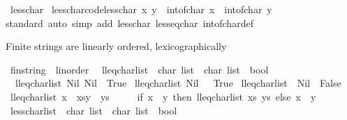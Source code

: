 \begin{isabellebody}
\isamarkupfalse%
\ less{\isacharunderscore}char\ \isanewline
less{\isacharunderscore}char{\isacharbrackleft}code{\isacharbrackright}{\isacharcolon}{\isachardoublequoteopen}less{\isacharunderscore}char\ x\ y\ {\isasymequiv}\ int{\isacharunderscore}of{\isacharunderscore}char\ x\ {\isacharless}\ int{\isacharunderscore}of{\isacharunderscore}char\ y{\isachardoublequoteclose}\isanewline
{}\isamarkupfalse%
\isanewline
%
\isadelimproof
\ \ %
\endisadelimproof
%
\isatagproof
{}\isamarkupfalse%
{\isacharparenleft}standard{\isacharcomma}\ auto\ simp\ add{\isacharcolon}\ less{\isacharunderscore}char\ less{\isacharunderscore}eq{\isacharunderscore}char\ int{\isacharunderscore}of{\isacharunderscore}char{\isacharunderscore}def{\isacharparenright}{\isacharplus}%
\endisatagproof
{\isafoldproof}%
%
\isadelimproof
\isanewline
%
\endisadelimproof
{}\isamarkupfalse%
%
\begin{isamarkuptext}%
Finite strings are linearly ordered, lexicographically%
\end{isamarkuptext}\isamarkuptrue%
\isamarkupfalse%
\ fin{\isacharunderscore}string\ {\isacharcolon}{\isacharcolon}\ linorder\ \isanewline
{}\isamarkupfalse%
\ lleq{\isacharunderscore}charlist\ {\isacharcolon}{\isacharcolon}\ {\isachardoublequoteopen}char\ list\ {\isasymRightarrow}\ char\ list\ {\isasymRightarrow}\ bool{\isachardoublequoteclose}\isanewline
\ \ \ \isanewline
\ \ {\isachardoublequoteopen}lleq{\isacharunderscore}charlist\ Nil\ Nil\ {\isacharequal}\ True{\isachardoublequoteclose}\isanewline
{\isacharbar}\ {\isachardoublequoteopen}lleq{\isacharunderscore}charlist\ Nil\ {\isacharunderscore}\ {\isacharequal}\ True{\isachardoublequoteclose}\isanewline
{\isacharbar}\ {\isachardoublequoteopen}lleq{\isacharunderscore}charlist\ {\isacharunderscore}\ Nil\ {\isacharequal}\ False{\isachardoublequoteclose}\isanewline
{\isacharbar}\ {\isachardoublequoteopen}lleq{\isacharunderscore}charlist\ {\isacharparenleft}x\ {\isacharhash}\ xs{\isacharparenright}{\isacharparenleft}y\ {\isacharhash}\ ys{\isacharparenright}\ {\isacharequal}\ \isanewline
\ \ \ {\isacharparenleft}if\ x\ {\isacharequal}\ y\ then\ lleq{\isacharunderscore}charlist\ xs\ ys\ else\ x\ {\isacharless}\ y{\isacharparenright}{\isachardoublequoteclose}\isanewline
\isanewline
{}\isamarkupfalse%
\ less{\isacharunderscore}charlist\ {\isacharcolon}{\isacharcolon}\ {\isachardoublequoteopen}char\ list\ {\isasymRightarrow}\ char\ list\ {\isasymRightarrow}\ bool{\isachardoublequoteclose}\isanewline

\end{isabellebody}
